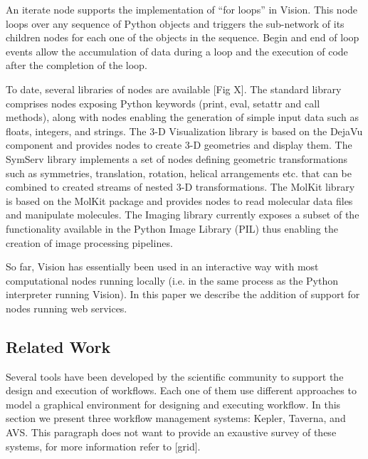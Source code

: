 \documentclass[conference]{IEEEtran}
\begin{document}
An iterate node supports the implementation of “for loops” in Vision. This
node loops over any sequence of Python objects and triggers the sub-network
of its children nodes for each one of the objects in the sequence. Begin
and end of loop events allow the accumulation of data during a loop and the
execution of code after the completion of the loop. 

To date, several libraries of nodes are available [Fig X]. The standard
library comprises nodes exposing Python keywords (print, eval, setattr and
call methods), along with nodes enabling the generation of simple input
data such as floats, integers, and strings. The 3-D Visualization library
is based on the DejaVu component and provides nodes to create 3-D
geometries and display them. The SymServ library implements a set of nodes
defining geometric transformations such as symmetries, translation,
rotation, helical arrangements etc. that can be combined to created streams
of nested 3-D transformations. The MolKit library is based on the MolKit
package and provides nodes to read molecular data files and manipulate
molecules. The Imaging library currently exposes a subset of the
functionality available in the Python Image Library (PIL) thus enabling the
creation of image processing pipelines.

So far, Vision has essentially been used in an interactive way with most
computational nodes running locally (i.e. in the same process as the Python
interpreter running Vision). In this paper we describe the addition of
support for nodes running web services. 




\subsection {Related Work}

Several tools have been developed by the scientific community to support
the design and execution of workflows. Each one of them use different
approaches to model a graphical environment for designing and executing
workflow.  In this section we present three workflow management systems:
Kepler, Taverna, and AVS. This paragraph does not want to provide an
exaustive survey of these systems, for more information refer to [grid].
\end{document}
